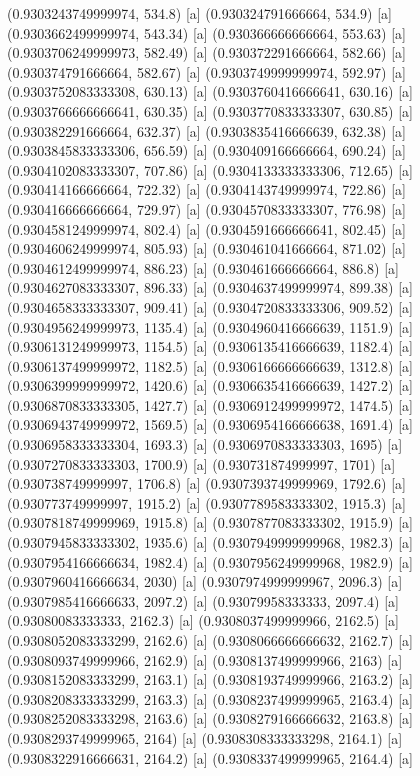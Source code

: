 {{{(0.9303243749999974, 534.8) [a] 
(0.930324791666664, 534.9) [a] 
(0.9303662499999974, 543.34) [a] 
(0.930366666666664, 553.63) [a] 
(0.9303706249999973, 582.49) [a] 
(0.930372291666664, 582.66) [a] 
(0.930374791666664, 582.67) [a] 
(0.9303749999999974, 592.97) [a] 
(0.9303752083333308, 630.13) [a] 
(0.9303760416666641, 630.16) [a] 
(0.9303766666666641, 630.35) [a] 
(0.9303770833333307, 630.85) [a] 
(0.930382291666664, 632.37) [a] 
(0.9303835416666639, 632.38) [a] 
(0.9303845833333306, 656.59) [a] 
(0.930409166666664, 690.24) [a] 
(0.9304102083333307, 707.86) [a] 
(0.9304133333333306, 712.65) [a] 
(0.930414166666664, 722.32) [a] 
(0.9304143749999974, 722.86) [a] 
(0.930416666666664, 729.97) [a] 
(0.9304570833333307, 776.98) [a] 
(0.9304581249999974, 802.4) [a] 
(0.9304591666666641, 802.45) [a] 
(0.9304606249999974, 805.93) [a] 
(0.930461041666664, 871.02) [a] 
(0.9304612499999974, 886.23) [a] 
(0.930461666666664, 886.8) [a] 
(0.9304627083333307, 896.33) [a] 
(0.9304637499999974, 899.38) [a] 
(0.9304658333333307, 909.41) [a] 
(0.9304720833333306, 909.52) [a] 
(0.9304956249999973, 1135.4) [a] 
(0.9304960416666639, 1151.9) [a] 
(0.9306131249999973, 1154.5) [a] 
(0.9306135416666639, 1182.4) [a] 
(0.9306137499999972, 1182.5) [a] 
(0.9306166666666639, 1312.8) [a] 
(0.9306399999999972, 1420.6) [a] 
(0.9306635416666639, 1427.2) [a] 
(0.9306870833333305, 1427.7) [a] 
(0.9306912499999972, 1474.5) [a] 
(0.9306943749999972, 1569.5) [a] 
(0.9306954166666638, 1691.4) [a] 
(0.9306958333333304, 1693.3) [a] 
(0.9306970833333303, 1695) [a] 
(0.9307270833333303, 1700.9) [a] 
(0.930731874999997, 1701) [a] 
(0.930738749999997, 1706.8) [a] 
(0.9307393749999969, 1792.6) [a] 
(0.930773749999997, 1915.2) [a] 
(0.9307789583333302, 1915.3) [a] 
(0.9307818749999969, 1915.8) [a] 
(0.9307877083333302, 1915.9) [a] 
(0.9307945833333302, 1935.6) [a] 
(0.9307949999999968, 1982.3) [a] 
(0.9307954166666634, 1982.4) [a] 
(0.9307956249999968, 1982.9) [a] 
(0.9307960416666634, 2030) [a] 
(0.9307974999999967, 2096.3) [a] 
(0.9307985416666633, 2097.2) [a] 
(0.93079958333333, 2097.4) [a] 
(0.93080083333333, 2162.3) [a] 
(0.9308037499999966, 2162.5) [a] 
(0.9308052083333299, 2162.6) [a] 
(0.9308066666666632, 2162.7) [a] 
(0.9308093749999966, 2162.9) [a] 
(0.9308137499999966, 2163) [a] 
(0.9308152083333299, 2163.1) [a] 
(0.9308193749999966, 2163.2) [a] 
(0.9308208333333299, 2163.3) [a] 
(0.9308237499999965, 2163.4) [a] 
(0.9308252083333298, 2163.6) [a] 
(0.9308279166666632, 2163.8) [a] 
(0.9308293749999965, 2164) [a] 
(0.9308308333333298, 2164.1) [a] 
(0.9308322916666631, 2164.2) [a] 
(0.9308337499999965, 2164.4) [a] 
}}}
